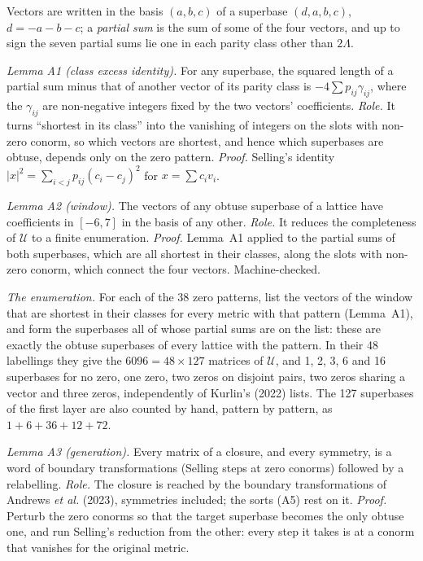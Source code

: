 Vectors are written in the basis $(a,b,c)$ of a superbase $(d,a,b,c)$, $d=-a-b-c$; a \emph{partial sum} is the sum of some of the four vectors, and up to sign the seven partial sums lie one in each parity class other than $2\Lambda$.

\emph{Lemma A1 (class excess identity).} For any superbase, the squared length of a partial sum minus that of another vector of its parity class is $-4\sum p_{ij}\gamma_{ij}$, where the $\gamma_{ij}$ are non-negative integers fixed by the two vectors' coefficients. \emph{Role.} It turns ``shortest in its class'' into the vanishing of integers on the slots with non-zero conorm, so which vectors are shortest, and hence which superbases are obtuse, depends only on the zero pattern. \emph{Proof.} Selling's identity $|x|^2=\sum_{i<j}p_{ij}(c_i-c_j)^2$ for $x=\sum c_iv_i$.

\emph{Lemma A2 (window).} The vectors of any obtuse superbase of a lattice have coefficients in $[-6,7]$ in the basis of any other. \emph{Role.} It reduces the completeness of $\mathcal U$ to a finite enumeration. \emph{Proof.} Lemma~A1 applied to the partial sums of both superbases, which are all shortest in their classes, along the slots with non-zero conorm, which connect the four vectors. Machine-checked.

\emph{The enumeration.} For each of the 38 zero patterns, list the vectors of the window that are shortest in their classes for every metric with that pattern (Lemma~A1), and form the superbases all of whose partial sums are on the list: these are exactly the obtuse superbases of every lattice with the pattern. In their 48 labellings they give the $6096=48\times127$ matrices of $\mathcal U$, and 1, 2, 3, 6 and 16 superbases for no zero, one zero, two zeros on disjoint pairs, two zeros sharing a vector and three zeros, independently of Kurlin's (2022) lists. The 127 superbases of the first layer are also counted by hand, pattern by pattern, as $1+6+36+12+72$.

\emph{Lemma A3 (generation).} Every matrix of a closure, and every symmetry, is a word of boundary transformations (Selling steps at zero conorms) followed by a relabelling. \emph{Role.} The closure is reached by the boundary transformations of Andrews \emph{et al.} (2023), symmetries included; the sorts (A5) rest on it. \emph{Proof.} Perturb the zero conorms so that the target superbase becomes the only obtuse one, and run Selling's reduction from the other: every step it takes is at a conorm that vanishes for the original metric.

